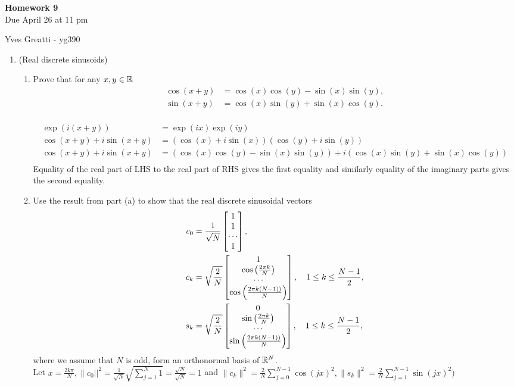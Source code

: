\documentclass[12pt,twoside]{article}
\begin{document}
\begin{center}
{\large{\textbf{Homework 9}} } \vspace{0.2cm}\\
Due April 26 at 11 pm
\end{center}
Yves Greatti - yg390\\


\begin{enumerate}

\item (Real discrete sinusoids)

 \begin{enumerate}
 \item Prove that for any $x,y\in\mathbb{R}$
  \begin{align}
 \cos(x+y) & = \cos(x)\cos(y) - \sin(x)\sin(y) ,\\
 \sin(x+y) & = \cos(x)\sin(y) + \sin(x)\cos(y) .
 \end{align}\\
 
 \begin{align*}
	  \exp(i (x+y)) 					&= \exp(ix) \exp(iy) \\
 	 \cos(x+y) + i \sin(x+y)			&= (\cos(x) + i \sin(x))(\cos(y) + i \sin(y)) \\
	  \cos(x+y) + i \sin(x+y)			&= (\cos(x) \cos(y) -  \sin(x) \sin(y)) + i (\cos(x) \sin(y) +  \sin(x) \cos(y)) \\
 \end{align*}
Equality of the real part of LHS to the real part of RHS gives the first equality and similarly equality of  the imaginary parts gives the second equality.
 
 \item Use the result from part (a) to show that the real discrete sinusoidal vectors
 \begin{align}
 c_0 & = \frac{1}{\sqrt{N}}\begin{bmatrix} 1 \\ 1 \\ \cdots \\ 1 \end{bmatrix},\\
c_k & = \sqrt{\frac{2}{N}}\begin{bmatrix} 1 \\ \cos \left( \frac{2 \pi k }{N} \right) \\ \cdots \\ \cos \left( \frac{2 \pi k (N-1))}{N} \right) \end{bmatrix}, \quad 1 \leq k \leq \frac{N-1}{2},\\
 s_k & = \sqrt{\frac{2}{N}}\begin{bmatrix} 0 \\ \sin \left( \frac{2 \pi k }{N} \right) \\ \cdots \\ \sin \left( \frac{2 \pi k (N-1))}{N} \right) \end{bmatrix}, \quad 1 \leq k \leq \frac{N-1}{2},
 \end{align}
 where we assume that $N$ is odd, form an orthonormal basis of $\mathbb{R}^{N}$.\\
Let $x=\frac{2 k \pi}{N}, \|c_0||^2 =  \frac{1}{\sqrt{N}} \sqrt{\sum_{j=1}^N 1} = \frac{\sqrt{N}} {\sqrt{N}} = 1$ 
and $\|c_k\|^2 = \frac{2}{N} \sum_{j=0}^{N-1} \cos(j x)^2, \|s_k\|^2 = \frac{2}{N} \sum_{j=1}^{N-1} \sin(j x)^2)$
 

\end{enumerate}
\end{enumerate}
\end{document}
